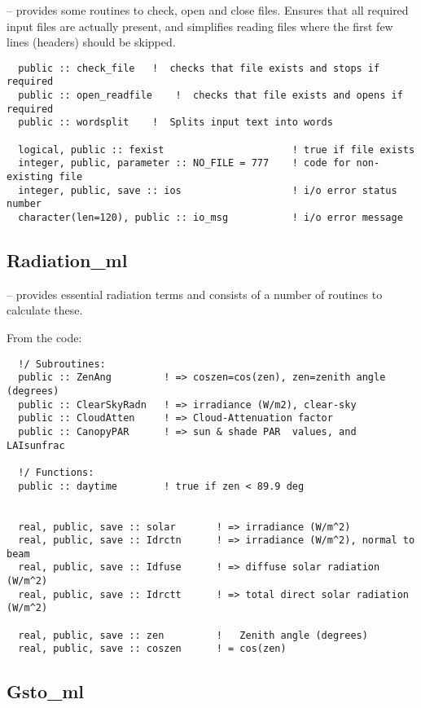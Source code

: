 \documentclass[12pt]{article}
\begin{document}
-- provides some routines to check, open and close files. Ensures
   that all required input files are actually present, and simplifies
   reading files where the first few lines (headers) should be skipped.


\begin{footnotesize}
\begin{verbatim}
  public :: check_file   !  checks that file exists and stops if required
  public :: open_readfile    !  checks that file exists and opens if required
  public :: wordsplit    !  Splits input text into words
 
  logical, public :: fexist                      ! true if file exists
  integer, public, parameter :: NO_FILE = 777    ! code for non-existing file
  integer, public, save :: ios                   ! i/o error status number
  character(len=120), public :: io_msg           ! i/o error message
\end{verbatim}
\end{footnotesize}


\subsection{Radiation\_ml}

-- provides essential radiation terms and
consists of a number of routines to calculate these.

From the code:
\begin{footnotesize}
\begin{verbatim}
  !/ Subroutines:
  public :: ZenAng         ! => coszen=cos(zen), zen=zenith angle (degrees)
  public :: ClearSkyRadn   ! => irradiance (W/m2), clear-sky
  public :: CloudAtten     ! => Cloud-Attenuation factor
  public :: CanopyPAR      ! => sun & shade PAR  values, and LAIsunfrac

  !/ Functions:
  public :: daytime        ! true if zen < 89.9 deg


  real, public, save :: solar       ! => irradiance (W/m^2)
  real, public, save :: Idrctn      ! => irradiance (W/m^2), normal to beam
  real, public, save :: Idfuse      ! => diffuse solar radiation (W/m^2)
  real, public, save :: Idrctt      ! => total direct solar radiation (W/m^2)

  real, public, save :: zen         !   Zenith angle (degrees)
  real, public, save :: coszen      ! = cos(zen)
\end{verbatim}
\end{footnotesize}


\subsection{Gsto\_ml}
\end{document}
